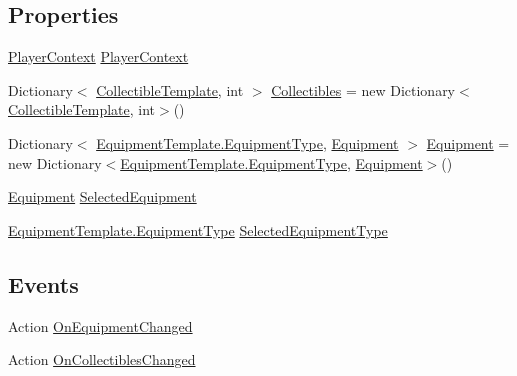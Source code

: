 \subsection*{Properties}
\begin{DoxyCompactItemize}
\item 
\mbox{\hyperlink{class_player_context}{Player\+Context}} \mbox{\hyperlink{class_inventory_a3ea6a5ffe1baad0e490450748024fd30}{Player\+Context}}
\item 
Dictionary$<$ \mbox{\hyperlink{class_collectible_template}{Collectible\+Template}}, int $>$ \mbox{\hyperlink{class_inventory_a6b55b68014aa7272addad95357875072}{Collectibles}} = new Dictionary$<$\mbox{\hyperlink{class_collectible_template}{Collectible\+Template}}, int$>$()
\item 
Dictionary$<$ \mbox{\hyperlink{class_equipment_template_ad390a9e6257d1d050f5d5fb5a8756633}{Equipment\+Template.\+Equipment\+Type}}, \mbox{\hyperlink{class_equipment}{Equipment}} $>$ \mbox{\hyperlink{class_inventory_add0863c4388ed45e0747c055ef80f1ad}{Equipment}} = new Dictionary$<$\mbox{\hyperlink{class_equipment_template_ad390a9e6257d1d050f5d5fb5a8756633}{Equipment\+Template.\+Equipment\+Type}}, \mbox{\hyperlink{class_equipment}{Equipment}}$>$()
\item 
\mbox{\hyperlink{class_equipment}{Equipment}} \mbox{\hyperlink{class_inventory_a174fcd1df7a1ddd591b97e4add4c0800}{Selected\+Equipment}}
\item 
\mbox{\hyperlink{class_equipment_template_ad390a9e6257d1d050f5d5fb5a8756633}{Equipment\+Template.\+Equipment\+Type}} \mbox{\hyperlink{class_inventory_adebbb0904a72afb32ccef951f45e49ed}{Selected\+Equipment\+Type}}
\end{DoxyCompactItemize}
\subsection*{Events}
\begin{DoxyCompactItemize}
\item 
Action \mbox{\hyperlink{class_inventory_a6e455a6cdc0133602282668e23b72c04}{On\+Equipment\+Changed}}
\item 
Action \mbox{\hyperlink{class_inventory_a1ddc2ee12b405f88efdd200fb71dcdee}{On\+Collectibles\+Changed}}
\end{DoxyCompactItemize}


